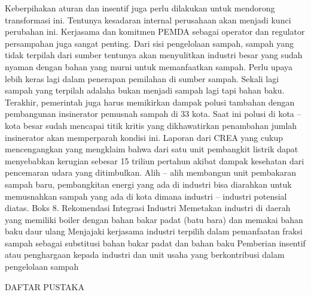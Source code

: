 \documentclass[
  letterpaper,
  DIV=11,
  numbers=noendperiod]{scrreprt}
\begin{document}
Keberpihakan aturan dan insentif juga perlu dilakukan untuk mendorong
transformasi ini. Tentunya kesadaran internal perusahaan akan menjadi
kunci perubahan ini. Kerjasama dan komitmen PEMDA sebagai operator dan
regulator persampahan juga sangat penting. Dari sisi pengelolaan sampah,
sampah yang tidak terpilah dari sumber tentunya akan menyulitkan
industri besar yang sudah nyaman dengan bahan yang murni untuk
memanfaatkan sampah. Perlu upaya lebih keras lagi dalam penerapan
pemilahan di sumber sampah. Sekali lagi sampah yang terpilah adalaha
bukan menjadi sampah lagi tapi bahan baku. Terakhir, pemerintah juga
harus memikirkan dampak polusi tambahan dengan pembangunan insinerator
pemusnah sampah di 33 kota. Saat ini polusi di kota -- kota besar sudah
mencapai titik kritis yang dikhawatirkan penambahan jumlah insinerator
akan memperparah kondisi ini. Laporan dari CREA yang cukup mencengangkan
yang mengklaim bahwa dari satu unit pembangkit listrik dapat menyebabkan
kerugian sebesar 15 triliun pertahun akibat dampak kesehatan dari
pencemaran udara yang ditimbulkan. Alih -- alih membangun unit
pembakaran sampah baru, pembangkitan energi yang ada di industri bisa
diarahkan untuk memusnahkan sampah yang ada di kota dimana industri --
industri potensial diatas. Boks 8. Rekomendasi Integrasi Industri
Memetakan industri di daerah yang memiliki boiler dengan bahan bakar
padat (batu bara) dan memakai bahan baku daur ulang Menjajaki kerjasama
industri terpilih dalam pemanfaatan fraksi sampah sebagai substitusi
bahan bakar padat dan bahan baku Pemberian insentif atau penghargaan
kepada industri dan unit usaha yang berkontribusi dalam pengelolaan
sampah

DAFTAR PUSTAKA
\end{document}
